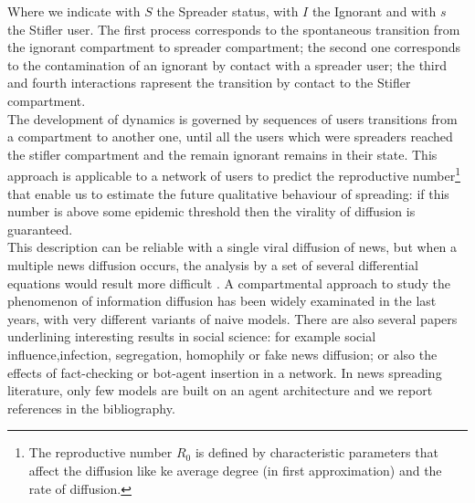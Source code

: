 \documentclass[11pt]{article} %
\begin{document}
Where we indicate with $S$ the Spreader status, with $I$ the Ignorant and with $s$ the Stifler user. 
The first process corresponds to the spontaneous transition from the ignorant compartment to spreader compartment;
 the second one corresponds to the contamination of an ignorant by contact with a spreader user; 
the third and fourth interactions rapresent the transition by contact to the Stifler compartment.  \\
The development of dynamics is governed by sequences of users transitions from a compartment to another one, until all the users which were spreaders reached the stifler compartment and the remain ignorant remains in their state.
This approach is applicable to a network of users to predict the reproductive 
number\footnote{The reproductive number $R_{0}$ is defined by characteristic parameters that affect the diffusion like ke average degree (in first approximation) and the rate of diffusion. } 
that enable us to estimate the future qualitative behaviour of spreading: 
if this number is above some epidemic threshold then the virality of diffusion is guaranteed.\\
This description can be reliable with a single viral diffusion of news, but when a
multiple news diffusion occurs, the analysis by a set of several differential equations would result more difficult .  
 A compartmental approach to study the phenomenon of information diffusion has been widely examinated in the last years, with very different variants of naive models.
There are also several papers underlining interesting results in social science: for example social influence,infection, segregation, homophily or fake news diffusion; or also the effects of fact-checking or bot-agent insertion in a network.
 In news spreading literature, only few models are built on an agent architecture and we report references in the bibliography.
\end{document}
